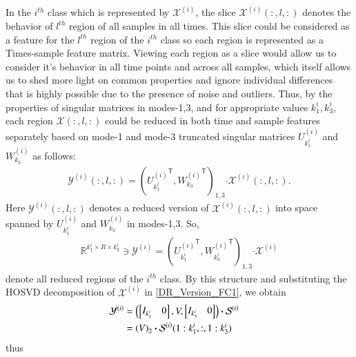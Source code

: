 \documentclass[preprint,12pt]{elsarticle}
\newcommand{\trans}{\mathsf{T}}
\begin{document}
	In the $i^{th}$ class which is represented by $\mathcal{X}^{(i)}$, the slice $\mathcal{X}^{(i)}(:,l,:)$ denotes
	the  behavior of $l^{th}$  region of all samples in all times.    
	This slice could be considered as a feature for the $l^{th}$ region of the $i^{th}$ class so each region is represented as a  Times-sample feature matrix. Viewing each region as a slice would allow us to consider it's behavior in all time points and across all samples, which itself allows us to shed more light on common properties and ignore individual differences that is highly possible due to the presence of noise and outliers.
Thus, by the properties of singular matrices in modes-1,3, and for appropriate values
$k_1^i,k_3^i$, each region $\mathcal{X}(:,l,:)$ could be reduced in both time and sample features separately
based on mode-1 and mode-3 truncated singular matrices $U_{k_1^i}^{(i)}$ and $W_{k_3}^{(i)}$
as follows:
\begin{eqnarray}
\mathcal{Y}^{(i)}(:,l,:) = \left( 
{U_{k_1^i}^{(i)}}^{\trans},  {W_{k_3}^{(i)}}^{\trans} 
\right)_{1,3} \boldsymbol{\cdot} \mathcal{X}^{(i)}(:,l,:).
\end{eqnarray}
Here $\mathcal{Y}^{(i)}(:,l,:)$  denotes a reduced version of $\mathcal{X}^{(i)}(:,l,:)$ into space
spanned by $U_{k_1^i}^{(i)}$ and $W_{k_3}^{(i)}$ in modes-1,3. So,
\begin{align}
\mathbb{R}^{k_1^i \times R \times k_3^i} \ni  {{\mathcal{Y}^{(i)}}} = \left( 
{U_{k_1^i}^{(i)}}^{\trans}, {W_{k^i_3}^{(i)}}^{\trans} 
\right)_{1,3}\boldsymbol{\cdot} \mathcal{X}^{(i)} \label{DR_Version_FC1}
\end{align} 
denote all reduced regions of the $i^{th}$ class. By this structure  and substituting the HOSVD decomposition of $\mathcal{X}^{(i)}$ in \eqref{DR_Version_FC1},  we obtain
\begin{align}
{\mathcal{Y}}^{(i)}&=  \notag
\left(
\begin{bmatrix}
I_{k_1^i} &  0
\end{bmatrix},
V,
\begin{bmatrix}
I_{k_3^i} &  0
\end{bmatrix}
\right)\boldsymbol{\cdot} \mathcal{S}^{(i)} \notag
\\&=\left( 
V
\right)_{2} \boldsymbol{\cdot} \mathcal{S}^{(i)}(1:k_1^i,:, 1:k_3^i) \notag &
\end{align}
thus
\end{document}
